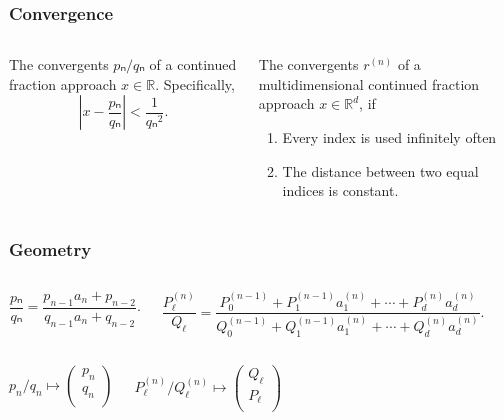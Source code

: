 \documentclass[aspectratio=169]{beamer}
\begin{document}

\begin{frame}
  \frametitle{Convergence}
  \small
  \begin{columns}[T]
    \begin{theorem}
      The convergents $pₙ/qₙ$ of a continued fraction approach $x ∈ ℝ$.
      Specifically,
      \[
        \left|x - \frac{pₙ}{qₙ}\right| < \frac{1}{qₙ^2}.
      \]
    \end{theorem}

    \begin{theorem}
      The convergents $r^{(n)}$ of a multidimensional continued fraction approach $x ∈ ℝ^d$, if
      \begin{enumerate}
        \item Every index is used infinitely often
        \item The distance between two equal indices is constant.
      \end{enumerate}
    \end{theorem}
  \end{columns}
\end{frame}

\begin{frame}
  \frametitle{Geometry}
  \small

  \begin{columns}
    \begin{lemma}
      \[
        \frac{pₙ}{qₙ} = \frac{p_{n-1} a_n + p_{n-2}}{q_{n-1} a_n + q_{n-2}}.
      \]
    \end{lemma}

    \begin{lemma}
      \[
        \frac{P_ℓ^{(n)}}{Q_ℓ}
        = \frac{P_0^{(n-1)} + P_1^{(n-1)} a_1^{(n)} + ⋯ + P_d^{(n)} a_d^{(n)}}
               {Q_0^{(n-1)} + Q_1^{(n-1)} a_1^{(n)} + ⋯ + Q_d^{(n)} a_d^{(n)}}.
      \]
    \end{lemma}
  \end{columns}

  \begin{columns}
    \[
      p_n/q_n ↦ \begin{pmatrix}
        p_n \\
        q_n \\
      \end{pmatrix}
    \]

    \[
      P_ℓ^{(n)}/Q_ℓ^{(n)} ↦ \begin{pmatrix}
        Q_ℓ \\
        P_ℓ \\
      \end{pmatrix}
    \]
  \end{columns}
\end{frame}
\end{document}
